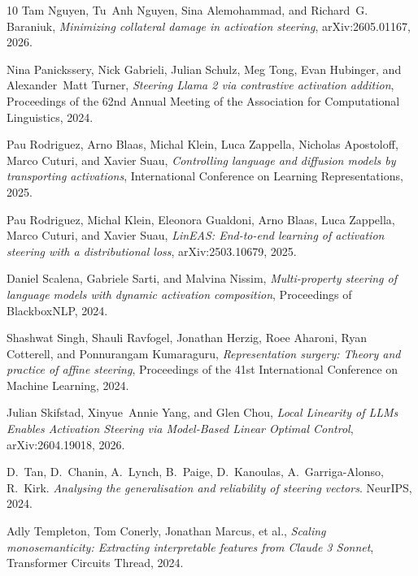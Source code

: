 \begin{thebibliography}{10}
Tam Nguyen, Tu~Anh Nguyen, Sina Alemohammad, and Richard~G. Baraniuk,
  \emph{Minimizing collateral damage in activation steering}, arXiv:2605.01167,
  2026.

Nina Panickssery, Nick Gabrieli, Julian Schulz, Meg Tong, Evan Hubinger, and
  Alexander~Matt Turner, \emph{Steering Llama 2 via contrastive activation
  addition}, Proceedings of the 62nd Annual Meeting of the Association for
  Computational Linguistics, 2024.

Pau Rodriguez, Arno Blaas, Michal Klein, Luca Zappella, Nicholas Apostoloff,
  Marco Cuturi, and Xavier Suau, \emph{Controlling language and diffusion models
  by transporting activations}, International Conference on Learning
  Representations, 2025.

Pau Rodriguez, Michal Klein, Eleonora Gualdoni, Arno Blaas, Luca Zappella, Marco
  Cuturi, and Xavier Suau, \emph{LinEAS: End-to-end learning of activation
  steering with a distributional loss}, arXiv:2503.10679, 2025.

Daniel Scalena, Gabriele Sarti, and Malvina Nissim, \emph{Multi-property
  steering of language models with dynamic activation composition}, Proceedings
  of BlackboxNLP, 2024.

Shashwat Singh, Shauli Ravfogel, Jonathan Herzig, Roee Aharoni, Ryan Cotterell,
  and Ponnurangam Kumaraguru, \emph{Representation surgery: Theory and practice
  of affine steering}, Proceedings of the 41st International Conference on
  Machine Learning, 2024.

Julian Skifstad, Xinyue~Annie Yang, and Glen Chou, \emph{Local Linearity of
  LLMs Enables Activation Steering via Model-Based Linear Optimal Control},
  arXiv:2604.19018, 2026.

D.~Tan, D.~Chanin, A.~Lynch, B.~Paige, D.~Kanoulas, A.~Garriga-Alonso, R.~Kirk.
  \emph{Analysing the generalisation and reliability of steering vectors}.
  NeurIPS, 2024.

Adly Templeton, Tom Conerly, Jonathan Marcus, et al., \emph{Scaling
  monosemanticity: Extracting interpretable features from Claude 3 Sonnet},
  Transformer Circuits Thread, 2024.


\end{thebibliography}
